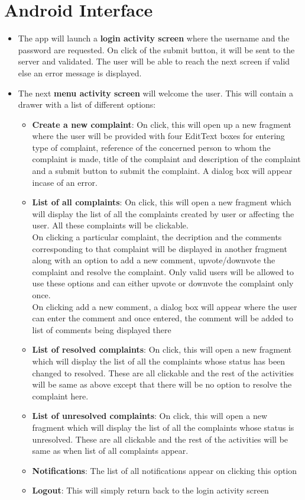 \documentclass[a4paper]{article}
\begin{document}
\section{Android Interface}
\begin{itemize}

\item The app will launch a \textbf{login activity screen} where the username and the password are requested. On click of the submit button, it will be sent to the server and validated. The user will be able to reach the next screen if valid else an error message is displayed.
\item The next \textbf{menu activity screen} will welcome the user. This will contain a drawer with a list of different options:
\begin{itemize}
\renewcommand\labelitemi{--}
\item \textbf{Create a new complaint}: On click, this will open up a new fragment where the user will be provided with four EditText boxes for entering type of complaint, reference of the concerned person to whom the complaint is made, title of the complaint and description of the complaint and a submit button to submit the complaint. A dialog box will appear incase of an error.
\item \textbf{List of all complaints}: On click, this will open a new fragment which will display the list of all the complaints created by user or affecting the user. All these complaints will be clickable.\\
On clicking a particular complaint, the decription and the comments corresponding to that complaint will be displayed in another fragment along with an option to add a new comment, upvote/downvote the complaint and resolve the complaint. Only valid users will be allowed to use these options and can either upvote or downvote the complaint only once.\\
On clicking add a new comment, a dialog box will appear where the user can enter the comment and once entered, the comment will be added to list of comments being displayed there

\item \textbf{ List of resolved complaints}: On click, this will open a new fragment which will display the list of all the complaints whose status has been changed to resolved. These are all clickable and the rest of the activities will be same as above except that there will be no option to resolve the complaint here. 

\item \textbf{List of unresolved complaints}: On click, this will open a new fragment which will display the list of all the complaints whose status is unresolved. These are all clickable and the rest of the activities will be same as when list of all complaints appear.

\item \textbf{Notifications}: The list of all notifications appear on clicking this option
\item \textbf{Logout}: This will simply return back to the login activity screen

\end{itemize}


\end{itemize}
\end{document}
